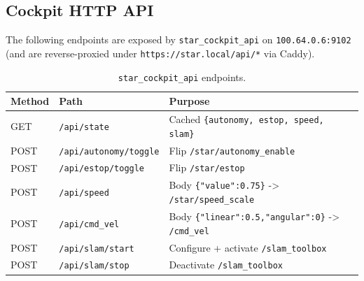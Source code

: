 \documentclass[11pt,letterpaper]{article}
\begin{document}
\subsection{Cockpit HTTP API}
The following endpoints are exposed by
\texttt{star\_cockpit\_api} on \texttt{100.64.0.6:9102} (and are
reverse-proxied under \texttt{https://star.local/api/*} via Caddy).

\begin{table}[H]
\centering
\caption{\texttt{star\_cockpit\_api} endpoints.}
\label{tab:cockpit}
\small
\begin{tabularx}{\linewidth}{l l X}
\toprule
\textbf{Method} & \textbf{Path} & \textbf{Purpose} \\
\midrule
GET  & \texttt{/api/state}           & Cached \texttt{\{autonomy, estop, speed, slam\}} \\
POST & \texttt{/api/autonomy/toggle} & Flip \texttt{/star/autonomy\_enable} \\
POST & \texttt{/api/estop/toggle}    & Flip \texttt{/star/estop} \\
POST & \texttt{/api/speed}           & Body \texttt{\{"value":0.75\}} -> \texttt{/star/speed\_scale} \\
POST & \texttt{/api/cmd\_vel}        & Body \texttt{\{"linear":0.5,"angular":0\}} -> \texttt{/cmd\_vel} \\
POST & \texttt{/api/slam/start}      & Configure + activate \texttt{/slam\_toolbox} \\
POST & \texttt{/api/slam/stop}       & Deactivate \texttt{/slam\_toolbox} \\
\bottomrule
\end{tabularx}
\end{table}
\end{document}

